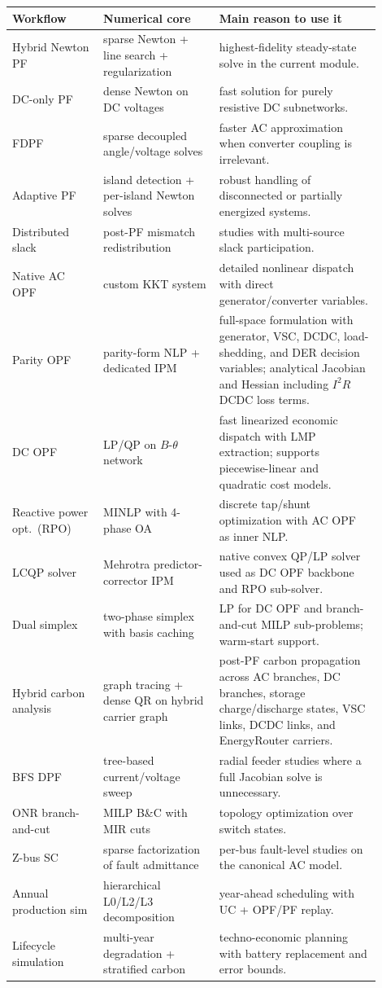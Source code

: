 \begin{longtable}{L{0.22\linewidth}L{0.29\linewidth}L{0.39\linewidth}}
\toprule
Workflow & Numerical core & Main reason to use it \\
\midrule
\endhead
Hybrid Newton PF & sparse Newton + line search + regularization & highest-fidelity steady-state solve in the current module. \\
DC-only PF & dense Newton on DC voltages & fast solution for purely resistive DC subnetworks. \\
FDPF & sparse decoupled angle/voltage solves & faster AC approximation when converter coupling is irrelevant. \\
Adaptive PF & island detection + per-island Newton solves & robust handling of disconnected or partially energized systems. \\
Distributed slack & post-PF mismatch redistribution & studies with multi-source slack participation. \\
Native AC OPF & custom KKT system & detailed nonlinear dispatch with direct generator/converter variables. \\
Parity OPF & parity-form NLP + dedicated IPM & full-space formulation with generator, VSC, DCDC, load-shedding, and DER decision variables; analytical Jacobian and Hessian including \(I^2R\) DCDC loss terms. \\
DC OPF & LP/QP on \(B\)-\(\theta\) network & fast linearized economic dispatch with LMP extraction; supports piecewise-linear and quadratic cost models. \\
Reactive power opt.\ (RPO) & MINLP with 4-phase OA & discrete tap/shunt optimization with AC OPF as inner NLP. \\
LCQP solver & Mehrotra predictor-corrector IPM & native convex QP/LP solver used as DC OPF backbone and RPO sub-solver. \\
Dual simplex & two-phase simplex with basis caching & LP for DC OPF and branch-and-cut MILP sub-problems; warm-start support. \\
Hybrid carbon analysis & graph tracing + dense QR on hybrid carrier graph & post-PF carbon propagation across AC branches, DC branches, storage charge/discharge states, VSC links, DCDC links, and EnergyRouter carriers. \\
BFS DPF & tree-based current/voltage sweep & radial feeder studies where a full Jacobian solve is unnecessary. \\
ONR branch-and-cut & MILP B\&C with MIR cuts & topology optimization over switch states. \\
Z-bus SC & sparse factorization of fault admittance & per-bus fault-level studies on the canonical AC model. \\
Annual production sim & hierarchical L0/L2/L3 decomposition & year-ahead scheduling with UC + OPF/PF replay. \\
Lifecycle simulation & multi-year degradation + stratified carbon & techno-economic planning with battery replacement and error bounds. \\
\bottomrule
\end{longtable}

